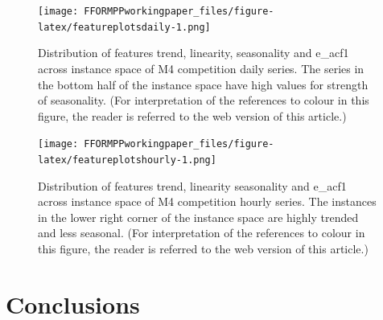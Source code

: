 \documentclass[11pt,a4paper,]{article}
\begin{document}
\begin{figure}
\centering
\texttt{[image: FFORMPPworkingpaper\_files/figure-latex/featureplotsdaily-1.png]}
\caption{\label{fig:featureplotsdaily}Distribution of features trend, linearity, seasonality and e\_acf1 across instance space of M4 competition daily series. The series in the bottom half of the instance space have high values for strength of seasonality. (For interpretation of the references to colour in this figure, the reader is referred to the web version of this article.)}
\end{figure}

\begin{figure}
\centering
\texttt{[image: FFORMPPworkingpaper\_files/figure-latex/featureplotshourly-1.png]}
\caption{\label{fig:featureplotshourly}Distribution of features trend, linearity seasonality and e\_acf1 across instance space of M4 competition hourly series. The instances in the lower right corner of the instance space are highly trended and less seasonal. (For interpretation of the references to colour in this figure, the reader is referred to the web version of this article.)}
\end{figure}

\hypertarget{conclusion}{%
\section{Conclusions}\label{conclusion}}
\end{document}
